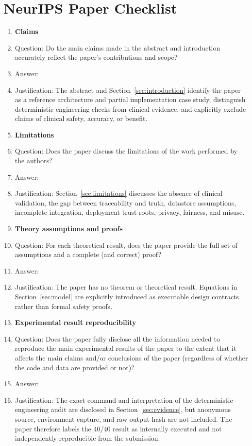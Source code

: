 \section*{NeurIPS Paper Checklist}

\begin{enumerate}

\item {\bf Claims}
    \item[] Question: Do the main claims made in the abstract and introduction accurately reflect the paper's contributions and scope?
    \item[] Answer: \answerYes{}
    \item[] Justification: The abstract and Section~\ref{sec:introduction}
    identify the paper as a reference architecture and partial implementation
    case study, distinguish
    deterministic engineering checks from clinical evidence, and explicitly
    exclude claims of clinical safety, accuracy, or benefit.

\item {\bf Limitations}
    \item[] Question: Does the paper discuss the limitations of the work performed by the authors?
    \item[] Answer: \answerYes{}
    \item[] Justification: Section~\ref{sec:limitations} discusses the absence
    of clinical validation, the gap between traceability and truth, datastore
    assumptions, incomplete integration, deployment trust roots, privacy,
    fairness, and misuse.

\item {\bf Theory assumptions and proofs}
    \item[] Question: For each theoretical result, does the paper provide the full set of assumptions and a complete (and correct) proof?
    \item[] Answer: \answerNA{}
    \item[] Justification: The paper has no theorem or theoretical result.
    Equations in Section~\ref{sec:model} are explicitly introduced as
    executable design contracts rather than formal safety proofs.

\item {\bf Experimental result reproducibility}
    \item[] Question: Does the paper fully disclose all the information needed to reproduce the main experimental results of the paper to the extent that it affects the main claims and/or conclusions of the paper (regardless of whether the code and data are provided or not)?
    \item[] Answer: \answerNo{}
    \item[] Justification: The exact command and interpretation of the
    deterministic engineering audit are disclosed in
    Section~\ref{sec:evidence}, but anonymous source, environment capture, and
    raw-output hash are not included.  The paper therefore labels the 40/40
    result as internally executed and not independently reproducible from the
    submission.


\end{enumerate}
